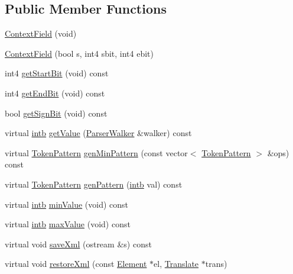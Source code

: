 \subsection*{Public Member Functions}
\begin{DoxyCompactItemize}
\item 
\mbox{\hyperlink{class_context_field_a87676c92e1697af7859cb1ae623c215c}{Context\+Field}} (void)
\item 
\mbox{\hyperlink{class_context_field_affb58e313cc01057dc7e5d1d7c50ea6d}{Context\+Field}} (bool s, int4 sbit, int4 ebit)
\item 
int4 \mbox{\hyperlink{class_context_field_a5aebf2f7b5e60f99a2fac433d8b92ac4}{get\+Start\+Bit}} (void) const
\item 
int4 \mbox{\hyperlink{class_context_field_a5796a7644818d7a95373bb14a19aca8a}{get\+End\+Bit}} (void) const
\item 
bool \mbox{\hyperlink{class_context_field_a13700f86da50a8e534d19e63a0b4658d}{get\+Sign\+Bit}} (void) const
\item 
virtual \mbox{\hyperlink{types_8h_aa925ba3e627c2df89d5b1cfe84fb8572}{intb}} \mbox{\hyperlink{class_context_field_aec7ed9eac68940e815b6f9cc9c5d2492}{get\+Value}} (\mbox{\hyperlink{class_parser_walker}{Parser\+Walker}} \&walker) const
\item 
virtual \mbox{\hyperlink{class_token_pattern}{Token\+Pattern}} \mbox{\hyperlink{class_context_field_a715c15711f5b53e64694b654060e3257}{gen\+Min\+Pattern}} (const vector$<$ \mbox{\hyperlink{class_token_pattern}{Token\+Pattern}} $>$ \&ops) const
\item 
virtual \mbox{\hyperlink{class_token_pattern}{Token\+Pattern}} \mbox{\hyperlink{class_context_field_a678309088b2bad377ad5a5894509988b}{gen\+Pattern}} (\mbox{\hyperlink{types_8h_aa925ba3e627c2df89d5b1cfe84fb8572}{intb}} val) const
\item 
virtual \mbox{\hyperlink{types_8h_aa925ba3e627c2df89d5b1cfe84fb8572}{intb}} \mbox{\hyperlink{class_context_field_a53a80959fd559909162619b5f899bb2e}{min\+Value}} (void) const
\item 
virtual \mbox{\hyperlink{types_8h_aa925ba3e627c2df89d5b1cfe84fb8572}{intb}} \mbox{\hyperlink{class_context_field_aa72fece0728c113a1218bb0c756e0a1d}{max\+Value}} (void) const
\item 
virtual void \mbox{\hyperlink{class_context_field_aa54ed050666315f386a216d1d2d98806}{save\+Xml}} (ostream \&s) const
\item 
virtual void \mbox{\hyperlink{class_context_field_a6d877297cc00c922dea6a1cfe12bec09}{restore\+Xml}} (const \mbox{\hyperlink{class_element}{Element}} $\ast$el, \mbox{\hyperlink{class_translate}{Translate}} $\ast$trans)
\end{DoxyCompactItemize}
